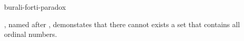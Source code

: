 \documentclass{stex}
\begin{document}
\begin{smodule}{burali-forti-paradox}
\begin{sparagraph}[style=symdoc]
  , named after , demonstates that there cannot exists a set that contains all ordinal numbers.
\end{sparagraph}
\end{smodule}
\end{document}
